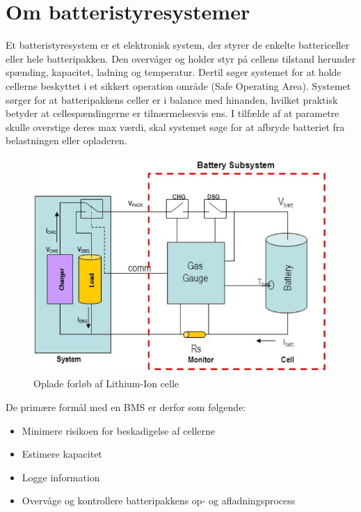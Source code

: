 \section{Om batteristyresystemer}
Et batteristyresystem er et elektronisk system, der styrer de enkelte battericeller eller hele batteripakken. Den overvåger og holder styr på cellens tilstand herunder spænding, kapacitet, ladning og temperatur. Dertil søger systemet for at holde cellerne beskyttet i et sikkert operation område (Safe Operating Area). Systemet sørger for at batteripakkens celler er i balance med hinanden, hvilket praktisk betyder at cellespændingerne er tilnærmelsesvis ens. I tilfælde af at parametre skulle overstige deres max værdi, skal systemet søge for at afbryde batteriet fra belastningen eller opladeren.
\\

\begin{figure}[h]
	\centering
	\includegraphics[width=12cm]{billeder/battery_management_block.png}
	\caption{Oplade forløb af Lithium-Ion celle}
	\label{fig:battery_management_block}
\end{figure}

De primære formål med en BMS er derfor som følgende:
\begin{itemize}[noitemsep]
	\item Minimere risikoen for beskadigelse af cellerne
	\item Estimere kapacitet
	\item Logge information
	\item Overvåge og kontrollere batteripakkens op- og afladningsprocess
\end{itemize}



